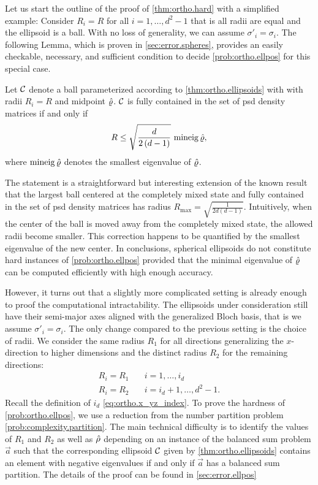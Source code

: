 Let us start the outline of the proof of \cref{thm:ortho.hard} with a simplified example:
Consider $R_{i}=R$ for all $i=1,\ldots,d^{2}-1$ that is all radii are equal and the ellipsoid is a ball.
With no loss of generality, we can assume $\sigma'_i = \sigma_i$.
The following Lemma, which is proven in \cref{sec:error.spheres}, provides an easily checkable, necessary, and sufficient condition to decide \cref{prob:ortho.ellpos} for this special case.
\begin{lemma}\label{lem:ortho.spheres}
  Let $\mathcal{C}$ denote a ball parameterized according to \cref{thm:ortho.ellipsoids} with with radii $R_i=R$ and midpoint $\hat{\varrho}$.
  $\mathcal{C}$ is fully contained in the set of psd density matrices if and only if
  \[
    R\leq\sqrt{\frac{d}{2\left(d-1\right)}} \, \operatorname{mineig} \hat{\varrho},
  \]
  where $\operatorname{mineig}\hat{\varrho}$ denotes the smallest eigenvalue of $\hat{\varrho}$.
\end{lemma}
The statement is a straightforward but interesting extension of the known result that the largest ball centered at the completely mixed state and fully contained in the set of psd density matrices has radius $R_{\mathrm{max}}=\sqrt{\frac{1}{2d\left(d-1\right)}}$.
Intuitively, when the center of the ball is moved away from the completely mixed state, the allowed radii become smaller.
This correction happens to be quantified by the smallest eigenvalue of the new center.
In conclusions, spherical ellipsoids do not constitute hard instances of \cref{prob:ortho.ellpos} provided that the minimal eigenvalue of $\hat{\varrho}$ can be computed efficiently with high enough accuracy.

However, it turns out that a slightly more complicated setting is already enough to proof the computational intractability.
The ellipsoids under consideration still have their semi-major axes aligned with the generalized Bloch basis, that is we assume $\sigma'_i = \sigma_i$.
The only change compared to the previous setting is the choice of radii.
We consider the same radius $R_{1}$ for all directions generalizing the $x$-direction to higher dimensions and the distinct radius $R_{2}$ for the remaining directions:
\[
  \label{eq:ortho.subclass}
  \begin{split}
    R_{i}=R_{1} &\quad i=1,\ldots,i_{d}\\
    R_{i}=R_{2} &\quad i=i_{d}+1,\ldots,d^{2}-1.
  \end{split}
\]
Recall the definition of $i_d$ \cref{eq:ortho.x_yz_index}.
To prove the hardness of \cref{prob:ortho.ellpos}, we use a reduction from the number partition problem \ref{prob:complexity.partition}.
The main technical difficulty is to identify the values of $R_1$ and $R_2$ as well as $\hat{\rho}$ depending on an instance of the balanced sum problem $\vec a$ such that the corresponding ellipsoid $\mathcal{C}$ given by \cref{thm:ortho.ellipsoids} contains an element with negative eigenvalues if and only if $\vec a$ has a balanced sum partition.
The details of the proof can be found in \cref{sec:error.ellpos}







